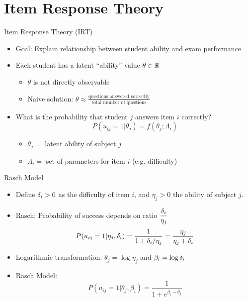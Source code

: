\documentclass{beamer}
\def \R{\ensuremath \mathbb{R}}
\def \d{\ensuremath \delta}
\theoremstyle{definition}
\begin{document}
\section{Item Response Theory}

\begin{frame}{Item Response Theory (IRT)}
\begin{itemize}
  \item Goal: Explain relationship between student ability and exam performance
  \item Each student has a latent ``ability'' value $\theta \in \R$
  \begin{itemize}
    \item<2-> $\theta$ is not directly observable
    \item<2-> Naive solution: $\theta \approx \displaystyle\frac{\text{questions answered correctly}}{\text{total number of questions}}$
  \end{itemize}
  \smallskip
  \item<3> What is the probability that student $j$ answers item $i$ correctly?
  \[P(u_{ij}=1 | \theta_j) = f(\theta_j; \Lambda_i)\]
  \begin{itemize}
    \item<3> $\theta_j =$ latent ability of subject $j$
    \item<3> $\Lambda_i =$ set of parameters for item $i$ (e.g. difficulty)
  \end{itemize}
\end{itemize}
\end{frame}

\begin{frame}{Rasch Model}
\begin{itemize}
  \item Define $\d_i > 0$ as the difficulty of item $i$, and $\eta_j > 0$ the ability of subject $j$.
  \item Rasch: Probability of success depends on ratio $\displaystyle \frac{\d_i}{\eta_j}$
    \[P(u_{ij} = 1 | \eta_j, \d_i) = \frac{1}{1 + \d_i/\eta_j} = \frac{\eta_j}{\eta_j + \d_i}\]
  \item<2-> Logarithmic transformation: $\theta_j = \log \eta_j$ and $\beta_i = \log \d_i$
  \item<2-> Rasch Model:
    \[P(u_{ij} = 1 | \theta_j, \beta_i) = \frac{1}{1 + e^{\beta_i - \theta_j}}\]
\end{itemize}
\end{frame}
\end{document}
